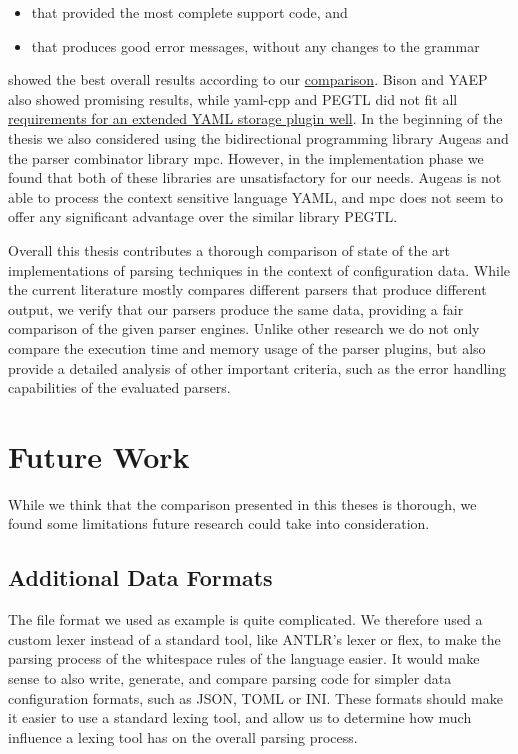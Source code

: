 \begin{itemize}
  \item that provided the most complete support code, and
  \item that produces good error messages, without any changes to the grammar
\end{itemize}

showed the best overall results according to our \hyperref[sec:evaluation]{comparison}. Bison and \gls{YAEP} also showed promising results, while yaml-cpp and PEGTL did not fit all \hyperref[sec:requirements_extended_yaml_plugin]{requirements for an extended YAML storage plugin well}. In the beginning of the thesis we also considered using the bidirectional programming library Augeas and the parser combinator library mpc. However, in the implementation phase we found that both of these libraries are unsatisfactory for our needs. Augeas is not able to process the context sensitive language YAML, and mpc does not seem to offer any significant advantage over the similar library \gls{PEGTL}.

Overall this thesis contributes a thorough comparison of state of the art implementations of parsing techniques in the context of configuration data. While the current literature mostly compares different parsers that produce different output, we verify that our parsers produce the same data, providing a fair comparison of the given parser engines. Unlike other research we do not only compare the execution time and memory usage of the parser plugins, but also provide a detailed analysis of other important criteria, such as the error handling capabilities of the evaluated parsers.

\section{Future Work}

While we think that the comparison presented in this theses is thorough, we found some limitations future research could take into consideration.

\subsection{Additional Data Formats}

The  file format we used as example is quite complicated. We therefore used a custom lexer instead of a standard tool, like ANTLR’s lexer or flex, to make the parsing process of the whitespace rules of the language easier. It would make sense to also write, generate, and compare parsing code for simpler data configuration formats, such as \gls{JSON}, TOML or INI. These formats should make it easier to use a standard lexing tool, and allow us to determine how much influence a lexing tool has on the overall parsing process.

